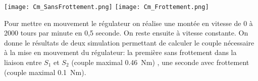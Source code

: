 

\begin{marginfigure}
\texttt{[image: Cm\_SansFrottement.png]}
\texttt{[image: Cm\_Frottement.png]}
\end{marginfigure}

Pour mettre en mouvement le régulateur on réalise une montée en vitesse de 0 à 2000 tours par minute en 0,5 seconde.  On reste ensuite à vitesse constante. On donne le résultats de deux simulation permettant de calculer le couple nécessaire à la mise en mouvement du régulateur: la première sans frottement dans la liaison entre $S_1$ et $S_2$ (couple maximal \SI{0,46}{Nm}) , une seconde avec frottement (couple maximal \SI{0,1}{Nm}). 






